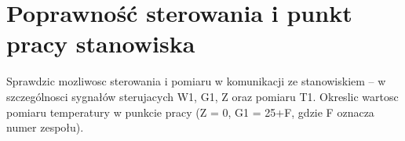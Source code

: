 \section{Poprawność sterowania i punkt pracy stanowiska}

Sprawdzic mozliwosc sterowania i pomiaru w komunikacji ze stanowiskiem – w szczególnosci
sygnałów sterujacych W1, G1, Z oraz pomiaru T1. Okreslic wartosc pomiaru
temperatury w punkcie pracy (Z = 0, G1 = 25+F, gdzie F oznacza numer zespołu).
